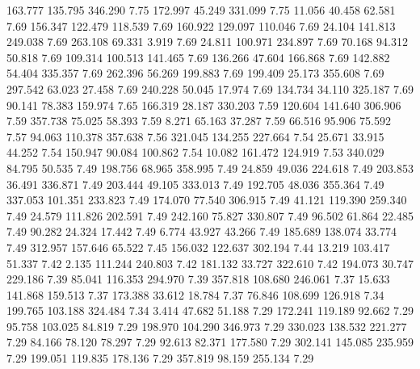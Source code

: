 163.777  135.795  346.290         7.75
 172.997   45.249  331.099         7.75
  11.056   40.458   62.581         7.69
 156.347  122.479  118.539         7.69
 160.922  129.097  110.046         7.69
  24.104  141.813  249.038         7.69
 263.108   69.331    3.919         7.69
  24.811  100.971  234.897         7.69
  70.168   94.312   50.818         7.69
 109.314  100.513  141.465         7.69
 136.266   47.604  166.868         7.69
 142.882   54.404  335.357         7.69
 262.396   56.269  199.883         7.69
 199.409   25.173  355.608         7.69
 297.542   63.023   27.458         7.69
 240.228   50.045   17.974         7.69
 134.734   34.110  325.187         7.69
  90.141   78.383  159.974         7.65
 166.319   28.187  330.203         7.59
 120.604  141.640  306.906         7.59
 357.738   75.025   58.393         7.59
   8.271   65.163   37.287         7.59
  66.516   95.906   75.592         7.57
  94.063  110.378  357.638         7.56
 321.045  134.255  227.664         7.54
  25.671   33.915   44.252         7.54
 150.947   90.084  100.862         7.54
  10.082  161.472  124.919         7.53
 340.029   84.795   50.535         7.49
 198.756   68.965  358.995         7.49
  24.859   49.036  224.618         7.49
 203.853   36.491  336.871         7.49
 203.444   49.105  333.013         7.49
 192.705   48.036  355.364         7.49
 337.053  101.351  233.823         7.49
 174.070   77.540  306.915         7.49
  41.121  119.390  259.340         7.49
  24.579  111.826  202.591         7.49
 242.160   75.827  330.807         7.49
  96.502   61.864   22.485         7.49
  90.282   24.324   17.442         7.49
   6.774   43.927   43.266         7.49
 185.689  138.074   33.774         7.49
 312.957  157.646   65.522         7.45
 156.032  122.637  302.194         7.44
  13.219  103.417   51.337         7.42
   2.135  111.244  240.803         7.42
 181.132   33.727  322.610         7.42
 194.073   30.747  229.186         7.39
  85.041  116.353  294.970         7.39
 357.818  108.680  246.061         7.37
  15.633  141.868  159.513         7.37
 173.388   33.612   18.784         7.37
  76.846  108.699  126.918         7.34
 199.765  103.188  324.484         7.34
   3.414   47.682   51.188         7.29
 172.241  119.189   92.662         7.29
  95.758  103.025   84.819         7.29
 198.970  104.290  346.973         7.29
 330.023  138.532  221.277         7.29
  84.166   78.120   78.297         7.29
  92.613   82.371  177.580         7.29
 302.141  145.085  235.959         7.29
 199.051  119.835  178.136         7.29
 357.819   98.159  255.134         7.29
